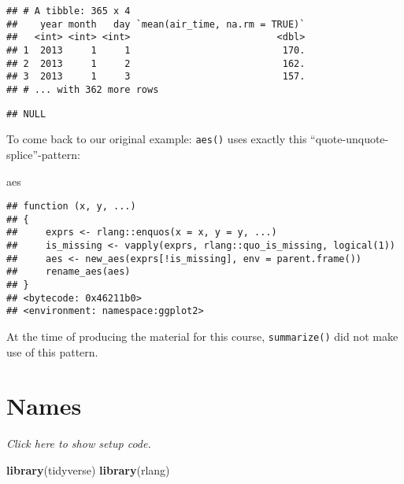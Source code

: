 \documentclass[]{book}
\newenvironment{Shaded}{\begin{snugshade}}{\end{snugshade}}
\newcommand{\KeywordTok}[1]{\textcolor[rgb]{0.13,0.29,0.53}{\textbf{#1}}}
\newcommand{\NormalTok}[1]{#1}
\newcommand{\OperatorTok}[1]{\textcolor[rgb]{0.81,0.36,0.00}{\textbf{#1}}}
\newcommand{\StringTok}[1]{\textcolor[rgb]{0.31,0.60,0.02}{#1}}
\begin{document}
\begin{verbatim}
## # A tibble: 365 x 4
##    year month   day `mean(air_time, na.rm = TRUE)`
##   <int> <int> <int>                          <dbl>
## 1  2013     1     1                           170.
## 2  2013     1     2                           162.
## 3  2013     1     3                           157.
## # ... with 362 more rows
\end{verbatim}

\begin{Shaded}
\end{Shaded}

\begin{verbatim}
## NULL
\end{verbatim}

To come back to our original example: \texttt{aes()} uses exactly this ``quote-unquote-splice''-pattern:

\begin{Shaded}
\begin{Highlighting}[]
\NormalTok{aes}
\end{Highlighting}
\end{Shaded}

\begin{verbatim}
## function (x, y, ...) 
## {
##     exprs <- rlang::enquos(x = x, y = y, ...)
##     is_missing <- vapply(exprs, rlang::quo_is_missing, logical(1))
##     aes <- new_aes(exprs[!is_missing], env = parent.frame())
##     rename_aes(aes)
## }
## <bytecode: 0x46211b0>
## <environment: namespace:ggplot2>
\end{verbatim}

At the time of producing the material for this course, \texttt{summarize()} did not make use of this pattern.

\hypertarget{named}{%
\section{Names}\label{named}}

\emph{Click here to show setup code.}

\begin{Shaded}
\begin{Highlighting}[]
\KeywordTok{library}\NormalTok{(tidyverse)}
\KeywordTok{library}\NormalTok{(rlang)}
\end{Highlighting}
\end{Shaded}
\end{document}
